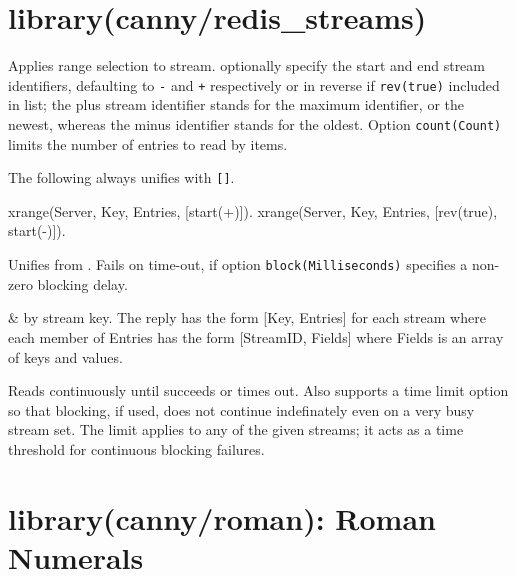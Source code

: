 \chapter{library(canny/redis_streams)}\label{sec:redisstreams}

\begin{description}
Applies range selection to  stream.  optionally specify
the start and end stream identifiers, defaulting to \verb$-$ and \verb$+$
respectively or in reverse if \verb$rev(true)$ included in  list;
the plus stream identifier stands for the maximum identifier, or
the newest, whereas the minus identifier stands for the oldest.
Option \verb$count(Count)$ limits the number of entries to read by
 items.

The following always unifies  with \verb$[]$.

\begin{code}
xrange(Server, Key, Entries, [start(+)]).
xrange(Server, Key, Entries, [rev(true), start(-)]).
\end{code}

Unifies  from . Fails on time-out, if option
\verb$block(Milliseconds)$ specifies a non-zero blocking delay.

\begin{arguments}
 & by stream key. The reply has the form [Key, Entries]
for each stream where each member of Entries has the form
[StreamID, Fields] where Fields is an array of keys and values. \\
\end{arguments}

\nodescription
Reads  continuously until  succeeds or times out. Also
supports a  time limit option so that blocking, if used, does
not continue indefinately even on a very busy stream set. The limit
applies to any of the given streams; it acts as a time threshold
for continuous blocking failures.
\end{description}

\chapter{library(canny/roman): Roman Numerals}\label{sec:roman}

